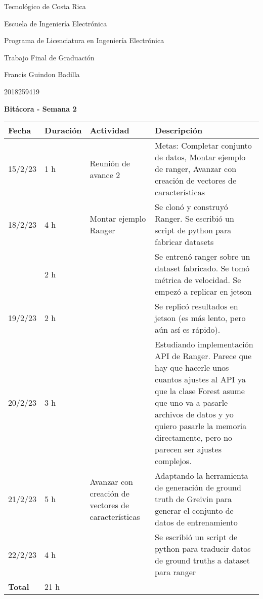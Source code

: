 \documentclass[12pt,oneside]{book}
\begin{document}
 \graphicspath{{./}{../tesis/fig/}}
  Tecnológico de Costa Rica
  \par\vspace{1mm}
  Escuela de Ingeniería Electrónica
  \par\vspace{1mm}
  Programa de Licenciatura en Ingeniería Electrónica
  \par\vspace{10mm}
  Trabajo Final de Graduación
  \par\vspace{1mm}
  Francis Guindon Badilla
  \par\vspace{1mm}
  2018259419
  \par\vspace{10mm}
  \large\textbf{Bitácora - Semana 2}
  \par\vspace{10mm}
  \small

  \begin{table} [!h]
    \centering
    \small
    \begin{tabular}{p{1.5 cm} p{2.1 cm} p{5 cm} p{8 cm}}
      \hline
      Fecha & Duración & Actividad & Descripción \\
      \hline
      15/2/23 & 1 h & Reunión de avance 2 & Metas: Completar conjunto de datos, Montar ejemplo de ranger, Avanzar con creación de vectores de características \\
      18/2/23 & 4 h &  Montar ejemplo Ranger & Se clonó y construyó Ranger. Se escribió un script de python para fabricar datasets \\
      & 2 h & & Se entrenó ranger sobre un dataset fabricado. Se tomó métrica de velocidad. Se empezó a replicar en jetson \\
      19/2/23 & 2 h & & Se replicó resultados en jetson (es más lento, pero aún así es rápido). \\
      20/2/23 & 3 h & & Estudiando implementación API de Ranger. Parece que hay que hacerle unos cuantos ajustes al API ya que la clase Forest asume que uno va a pasarle archivos de datos y yo quiero pasarle la memoria directamente, pero no parecen ser ajustes complejos. \\
      21/2/23 & 5 h & Avanzar con creación de vectores de características & Adaptando la herramienta de generación de ground truth de Greivin para generar el conjunto de datos de entrenamiento \\
      22/2/23 & 4 h & & Se escribió un script de python para traducir datos de ground truths a dataset para ranger \\
      \hline
      \textbf{Total} & 21 h \\
      \hline
    \end{tabular}
  \end{table}
  
\end{document}
